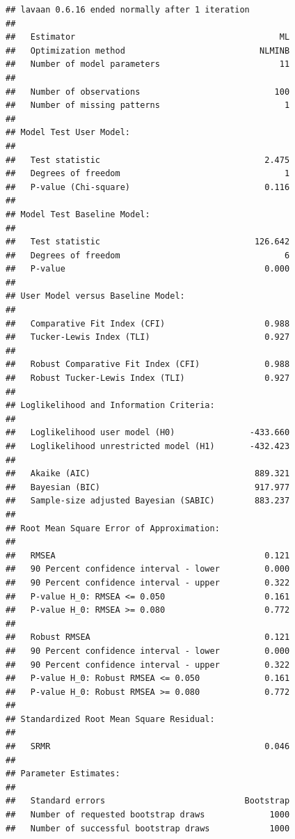 \documentclass[
  11pt,
]{book}
\begin{document}
\begin{verbatim}
## lavaan 0.6.16 ended normally after 1 iteration
## 
##   Estimator                                         ML
##   Optimization method                           NLMINB
##   Number of model parameters                        11
## 
##   Number of observations                           100
##   Number of missing patterns                         1
## 
## Model Test User Model:
##                                                       
##   Test statistic                                 2.475
##   Degrees of freedom                                 1
##   P-value (Chi-square)                           0.116
## 
## Model Test Baseline Model:
## 
##   Test statistic                               126.642
##   Degrees of freedom                                 6
##   P-value                                        0.000
## 
## User Model versus Baseline Model:
## 
##   Comparative Fit Index (CFI)                    0.988
##   Tucker-Lewis Index (TLI)                       0.927
##                                                       
##   Robust Comparative Fit Index (CFI)             0.988
##   Robust Tucker-Lewis Index (TLI)                0.927
## 
## Loglikelihood and Information Criteria:
## 
##   Loglikelihood user model (H0)               -433.660
##   Loglikelihood unrestricted model (H1)       -432.423
##                                                       
##   Akaike (AIC)                                 889.321
##   Bayesian (BIC)                               917.977
##   Sample-size adjusted Bayesian (SABIC)        883.237
## 
## Root Mean Square Error of Approximation:
## 
##   RMSEA                                          0.121
##   90 Percent confidence interval - lower         0.000
##   90 Percent confidence interval - upper         0.322
##   P-value H_0: RMSEA <= 0.050                    0.161
##   P-value H_0: RMSEA >= 0.080                    0.772
##                                                       
##   Robust RMSEA                                   0.121
##   90 Percent confidence interval - lower         0.000
##   90 Percent confidence interval - upper         0.322
##   P-value H_0: Robust RMSEA <= 0.050             0.161
##   P-value H_0: Robust RMSEA >= 0.080             0.772
## 
## Standardized Root Mean Square Residual:
## 
##   SRMR                                           0.046
## 
## Parameter Estimates:
## 
##   Standard errors                            Bootstrap
##   Number of requested bootstrap draws             1000
##   Number of successful bootstrap draws            1000

\end{verbatim}
\end{document}
